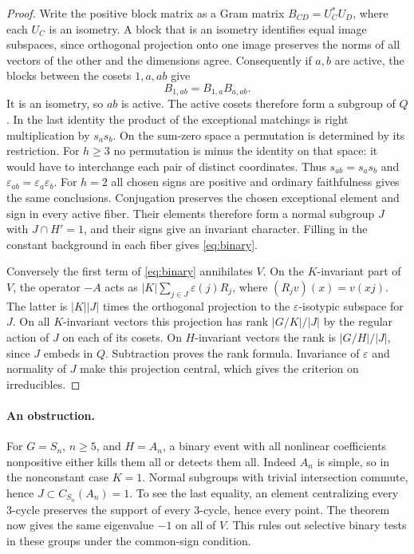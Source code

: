 \begin{proof}
Write the positive block matrix as a Gram matrix $B_{CD}=U_C^*U_D$, where each $U_C$ is an isometry. A block that is an isometry identifies equal image subspaces, since orthogonal projection onto one image preserves the norms of all vectors of the other and the dimensions agree. Consequently if $a,b$ are active, the blocks between the cosets $1,a,ab$ give
\[
                 B_{1,ab}=B_{1,a}B_{a,ab}.
\]
It is an isometry, so $ab$ is active. The active cosets therefore form a subgroup of $Q$. In the last identity the product of the exceptional matchings is right multiplication by $s_a s_b$. On the sum-zero space a permutation is determined by its restriction. For $h\ge3$ no permutation is minus the identity on that space: it would have to interchange each pair of distinct coordinates. Thus $s_{ab}=s_a s_b$ and $\varepsilon_{ab}=\varepsilon_a\varepsilon_b$. For $h=2$ all chosen signs are positive and ordinary faithfulness gives the same conclusions. Conjugation preserves the chosen exceptional element and sign in every active fiber. Their elements therefore form a normal subgroup $J$ with $J\cap H'=1$, and their signs give an invariant character. Filling in the constant background in each fiber gives \eqref{eq:binary}.

Conversely the first term of \eqref{eq:binary} annihilates $V$. On the $K$-invariant part of $V$, the operator $-A$ acts as $|K|\sum_{j\in J}\varepsilon(j)R_j$, where $(R_j v)(x)=v(xj)$. The latter is $|K||J|$ times the orthogonal projection to the $\varepsilon$-isotypic subspace for $J$. On all $K$-invariant vectors this projection has rank $|G/K|/|J|$ by the regular action of $J$ on each of its cosets. On $H$-invariant vectors the rank is $|G/H|/|J|$, since $J$ embeds in $Q$. Subtraction proves the rank formula. Invariance of $\varepsilon$ and normality of $J$ make this projection central, which gives the criterion on irreducibles.
\end{proof}

\paragraph{An obstruction.}
For $G=S_n$, $n\ge5$, and $H=A_n$, a binary event with all nonlinear coefficients nonpositive either kills them all or detects them all. Indeed $A_n$ is simple, so in the nonconstant case $K=1$. Normal subgroups with trivial intersection commute, hence $J\subset C_{S_n}(A_n)=1$. To see the last equality, an element centralizing every 3-cycle preserves the support of every 3-cycle, hence every point. The theorem now gives the same eigenvalue $-1$ on all of $V$. This rules out selective binary tests in these groups under the common-sign condition.

